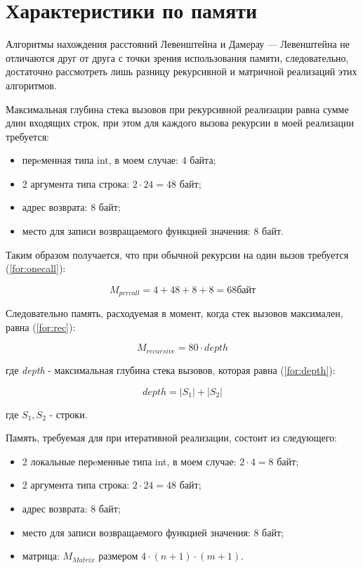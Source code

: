 \section{Характеристики по памяти}

Алгоритмы нахождения расстояний Левенштейна и Дамерау — Левенштейна не отличаются друг от друга с точки зрения использования памяти, следовательно, достаточно рассмотреть лишь разницу рекурсивной и матричной реализаций этих алгоритмов.

Максимальная глубина стека вызовов при рекурсивной реализации равна сумме длин входящих строк, при этом для каждого вызова рекурсии в моей реализации требуется:
\begin{itemize}
    \item перeменная типа int, в моем случае: $4 $ байта;
    \item 2 аргумента типа строка: $2 \cdot 24 = 48$ байт;
    \item адрес возврата: 8 байт;
    \item место для записи возвращаемого функцией значения: 8 байт.
\end{itemize}
Таким образом получается, что при обычной рекурсии на один вызов требуется (\ref{for:onecall}): 

\begin{equation}
M_{per call} = 4 + 48 + 8 + 8 = 68 байт
\label{for:onecall}
\end{equation}

Следовательно память, расходуемая в момент, когда стек вызовов максимален, равна (\ref{for:rec}): 

\begin{equation}
    M_{recursive} = 80 \cdot depth
\label{for:rec}
\end{equation}

где \textit{depth} - максимальная глубина стека вызовов, которая равна (\ref{for:depth}):

\begin{equation}
depth = |S_1| + |S_2|
\label{for:depth}
\end{equation}

где $S_1, S_2$ - строки.


Память, требуемая для при итеративной реализации, состоит из следующего:
\begin{itemize}
    \item 2 локальные перeменные типа int, в моем случае: $2 \cdot 4 = 8$ байт;
    \item 2 аргумента типа строка: $2 \cdot 24 = 48$ байт;
    \item адрес возврата: 8 байт;
    \item место для записи возвращаемого функцией значения: 8 байт;
    \item матрица: $M_{Matrix}$ размером $4 \cdot (n + 1) \cdot (m + 1)$.
\end{itemize}

